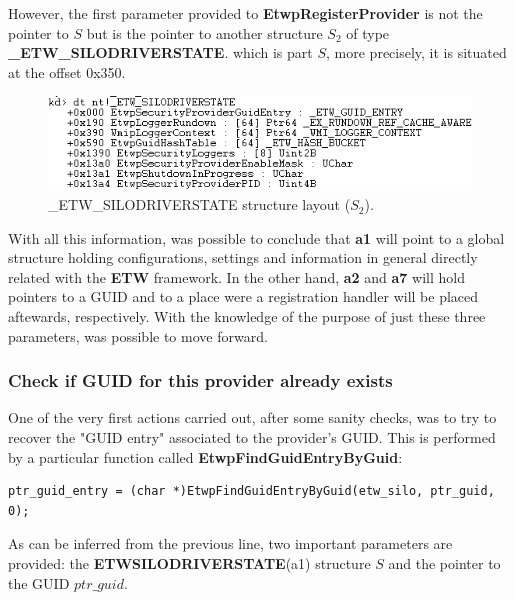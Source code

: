However, the first parameter provided to {\bfseries EtwpRegisterProvider} is not the pointer to $S$ but is the pointer to another structure $S_2$ of type {\bfseries \_ETW\_SILODRIVERSTATE}. which is part $S$, more precisely, it is situated at the offset 0x350. 

\begin{centering}
\begin{figure}[H]
  \includegraphics[width=12cm]{images/ETW_SILODRIVERSTATE_structure.png}
  \caption[]{\_ETW\_SILODRIVERSTATE structure layout ($S_2$).}
  \label{fig:etwsilodriverstate_structure}
\end{figure}
\end{centering}

With all this information, was possible to conclude that {\bfseries a1} will point to a global structure holding configurations, settings and information in general directly related with the {\bfseries ETW} framework. In the other hand, {\bfseries a2} and {\bfseries a7} will hold pointers to a GUID and to a place were a registration handler will be placed aftewards, respectively. 
With the knowledge of the purpose of just these three parameters, was possible to move forward.


\subsubsection{Check if GUID for this provider already exists}
One of the very first actions carried out, after some sanity checks, was to try to recover the "GUID entry" associated to the provider's GUID. This is performed by a particular function called {\bfseries EtwpFindGuidEntryByGuid}:

\begin{verbatim}
ptr_guid_entry = (char *)EtwpFindGuidEntryByGuid(etw_silo, ptr_guid, 0);
\end{verbatim}

As can be inferred from the previous line, two important parameters are provided: the {\bfseries ETWSILODRIVERSTATE}(a1) structure $S$ and the pointer to the GUID $ptr\_guid$.

